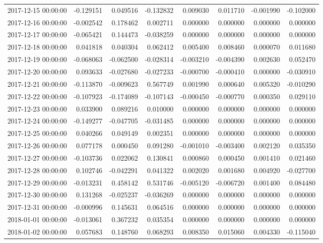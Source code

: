 \begin{tabular}{lrrrrrrr}
2017-12-15 00:00:00 & -0.129151 & 0.049516 & -0.132832 & 0.009030 & 0.011710 & -0.001990 & -0.102000 \\
2017-12-16 00:00:00 & -0.002542 & 0.178462 & 0.002711 & 0.000000 & 0.000000 & 0.000000 & 0.000000 \\
2017-12-17 00:00:00 & -0.065421 & 0.144473 & -0.038259 & 0.000000 & 0.000000 & 0.000000 & 0.000000 \\
2017-12-18 00:00:00 & 0.041818 & 0.040304 & 0.062412 & 0.005400 & 0.008460 & 0.000070 & 0.011680 \\
2017-12-19 00:00:00 & -0.068063 & -0.062500 & -0.028314 & -0.003210 & -0.004390 & 0.002630 & 0.052470 \\
2017-12-20 00:00:00 & 0.093633 & -0.027680 & -0.027233 & -0.000700 & -0.000410 & 0.000000 & -0.030910 \\
2017-12-21 00:00:00 & -0.113870 & -0.009623 & 0.567749 & 0.001990 & 0.000640 & 0.005320 & -0.010290 \\
2017-12-22 00:00:00 & -0.107923 & -0.174089 & -0.107143 & -0.000450 & -0.000770 & 0.000350 & 0.029110 \\
2017-12-23 00:00:00 & 0.033900 & 0.089216 & 0.010000 & 0.000000 & 0.000000 & 0.000000 & 0.000000 \\
2017-12-24 00:00:00 & -0.149277 & -0.047705 & -0.031485 & 0.000000 & 0.000000 & 0.000000 & 0.000000 \\
2017-12-25 00:00:00 & 0.040266 & 0.049149 & 0.002351 & 0.000000 & 0.000000 & 0.000000 & 0.000000 \\
2017-12-26 00:00:00 & 0.077178 & 0.000450 & 0.091280 & -0.001010 & -0.003400 & 0.002120 & 0.035350 \\
2017-12-27 00:00:00 & -0.103736 & 0.022062 & 0.130841 & 0.000860 & 0.000450 & 0.001410 & 0.021460 \\
2017-12-28 00:00:00 & 0.102746 & -0.042291 & 0.041322 & 0.002020 & 0.001680 & 0.004920 & -0.027700 \\
2017-12-29 00:00:00 & -0.013231 & 0.458142 & 0.531746 & -0.005120 & -0.006720 & 0.001400 & 0.084480 \\
2017-12-30 00:00:00 & 0.131268 & -0.025237 & -0.036269 & 0.000000 & 0.000000 & 0.000000 & 0.000000 \\
2017-12-31 00:00:00 & -0.000996 & 0.145631 & 0.064516 & 0.000000 & 0.000000 & 0.000000 & 0.000000 \\
2018-01-01 00:00:00 & -0.013061 & 0.367232 & 0.035354 & 0.000000 & 0.000000 & 0.000000 & 0.000000 \\
2018-01-02 00:00:00 & 0.057683 & 0.148760 & 0.068293 & 0.008350 & 0.015060 & 0.004330 & -0.115040 \\

\end{tabular}
